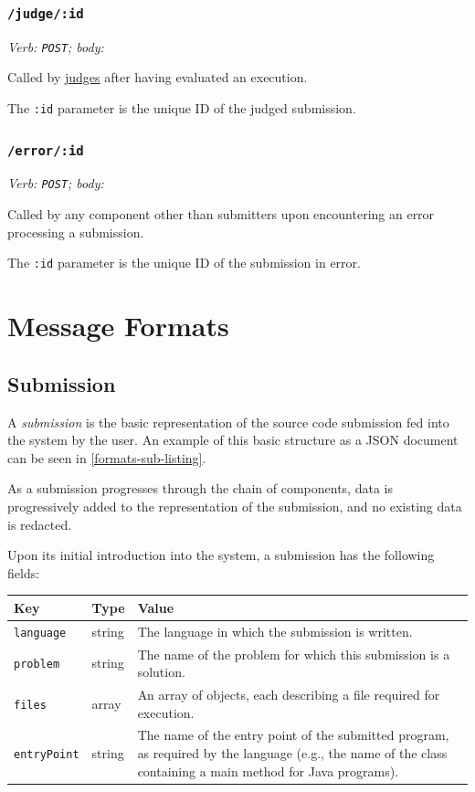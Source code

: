 \documentclass[11pt,letterpaper]{article}
\begin{document}
\subsubsection{\texttt{/judge/:id}}

\emph{Verb: \texttt{POST}; body: }

Called by \hyperref[design-exec-judge]{judges} after having evaluated an
execution.

The \texttt{:id} parameter is the unique ID of the judged submission.

\subsubsection{\texttt{/error/:id}}

\emph{Verb: \texttt{POST}; body: }

Called by any component other than submitters upon encountering an error
processing a submission.

The \texttt{:id} parameter is the unique ID of the submission in error.

\section{Message Formats}
\label{formats}

\subsection{Submission}
\label{formats-sub}

A \emph{submission} is the basic representation of the source code submission
fed into the system by the user. An example of this basic structure as a JSON
document can be seen in \autoref{formats-sub-listing}.

As a submission progresses through the chain of components, data is
progressively added to the representation of the submission, and no existing
data is redacted.

Upon its initial introduction into the system, a submission has the following
fields:

\nopagebreak
\begin{tabulary}{\textwidth}{ | l | l | L | }
    \hline
    \textbf{Key} & \textbf{Type} & \textbf{Value} \\
    \hline
    \texttt{language} & string & The language in which the submission is
        written. \\
    \hline
    \texttt{problem} & string & The name of the problem for which this
        submission is a solution. \\
    \hline
    \texttt{files} & array & An array of objects, each describing a file
        required for execution. \\
    \hline
    \texttt{entryPoint} & string & The name of the entry point of the submitted
        program, as required by the language (e.g., the name of the class
        containing a main method for Java programs). \\
    \hline
\end{tabulary}
\end{document}
